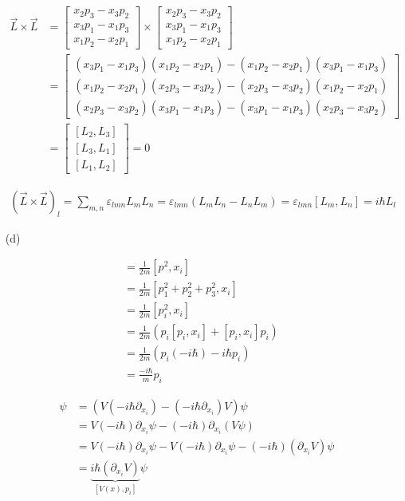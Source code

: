 \documentclass[11pt,a4paper]{article}
\begin{document}
\begin{enumerate}
\begin{align}
    \vec{L}\times\vec{L}&=
    \begin{bmatrix}
    x_2p_3-x_3p_2 \\
    x_3p_1-x_1p_3 \\
    x_1p_2-x_2p_1
    \end{bmatrix}
    \times
    \begin{bmatrix}
x_2p_3-x_3p_2 \\
x_3p_1-x_1p_3 \\
x_1p_2-x_2p_1
    \end{bmatrix}\\&=
    \begin{bmatrix}
    (x_3p_1-x_1p_3)(x_1p_2-x_2p_1)-(x_1p_2-x_2p_1)(x_3p_1-x_1p_3)\\
    (x_1p_2-x_2p_1)(x_2p_3-x_3p_2)-(x_2p_3-x_3p_2)(x_1p_2-x_2p_1)\\
    (x_2p_3-x_3p_2)(x_3p_1-x_1p_3)-(x_3p_1-x_1p_3)(x_2p_3-x_3p_2)
    \end{bmatrix}\\&=
    \begin{bmatrix}
    [L_2,L_3] \\
    [L_3,L_1] \\
    [L_1,L_2]
    \end{bmatrix}=0
\end{align}

\begin{align}
    (\vec{L}\times\vec{L})_l=\sum_{m,n}\varepsilon_{lmn}L_mL_n=\varepsilon_{lmn}(L_mL_n-L_nL_m)=\varepsilon_{lmn}[L_m,L_n]=i\hbar L_l
\end{align}

\item[(d)]

\begin{align}
    [\frac{p^2}{2m},x_i]&=\frac{1}{2m}[p^2,x_i]\\
    &=\frac{1}{2m}[p_1^2+p_2^2+p_3^2,x_i]\\
    &=\frac{1}{2m}[p_i^2,x_i]\\
    &=\frac{1}{2m}(p_i[p_i,x_i]+[p_i,x_i]p_i)\\
    &=\frac{1}{2m}(p_i(-i\hbar)-i\hbar p_i)\\
    &=\frac{-i\hbar}{m}p_i
\end{align}

\begin{align}
    [V(x),p_i]\psi
    &=(V(-i\hbar\partial_{x_i})-(-i\hbar\partial_{x_i})V)\psi\\
    &=V(-i\hbar)\partial_{x_i}\psi-(-i\hbar)\partial_{x_i}(V\psi)\\
    &=V(-i\hbar)\partial_{x_i}\psi-V(-i\hbar)\partial_{x_i}\psi-(-i\hbar)(\partial_{x_i}V)\psi\\
    &=\underset{[V(x),p_i]}{\underbrace{i\hbar(\partial_{x_i}V)}}\psi
\end{align}


\end{enumerate}
\end{document}
